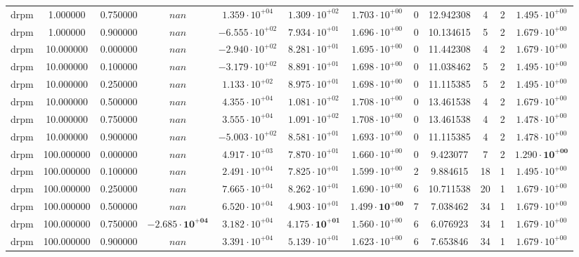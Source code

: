 \begin{table}
\begin{tabular}{cccccccccccc}
drpm & 1.000000 & 0.750000 & $nan$ & $1.359 \cdot 10^{+04}$ & $1.309 \cdot 10^{+02}$ & $1.703 \cdot 10^{+00}$ & 0 & 12.942308 & 4 & 2 & $1.495 \cdot 10^{+00}$ \\
drpm & 1.000000 & 0.900000 & $nan$ & $-6.555 \cdot 10^{+02}$ & $7.934 \cdot 10^{+01}$ & $1.696 \cdot 10^{+00}$ & 0 & 10.134615 & 5 & 2 & $1.679 \cdot 10^{+00}$ \\
drpm & 10.000000 & 0.000000 & $nan$ & $-2.940 \cdot 10^{+02}$ & $8.281 \cdot 10^{+01}$ & $1.695 \cdot 10^{+00}$ & 0 & 11.442308 & 4 & 2 & $1.679 \cdot 10^{+00}$ \\
drpm & 10.000000 & 0.100000 & $nan$ & $-3.179 \cdot 10^{+02}$ & $8.891 \cdot 10^{+01}$ & $1.698 \cdot 10^{+00}$ & 0 & 11.038462 & 5 & 2 & $1.495 \cdot 10^{+00}$ \\
drpm & 10.000000 & 0.250000 & $nan$ & $1.133 \cdot 10^{+02}$ & $8.975 \cdot 10^{+01}$ & $1.698 \cdot 10^{+00}$ & 0 & 11.115385 & 5 & 2 & $1.495 \cdot 10^{+00}$ \\
drpm & 10.000000 & 0.500000 & $nan$ & $4.355 \cdot 10^{+04}$ & $1.081 \cdot 10^{+02}$ & $1.708 \cdot 10^{+00}$ & 0 & 13.461538 & 4 & 2 & $1.679 \cdot 10^{+00}$ \\
drpm & 10.000000 & 0.750000 & $nan$ & $3.555 \cdot 10^{+04}$ & $1.091 \cdot 10^{+02}$ & $1.708 \cdot 10^{+00}$ & 0 & 13.461538 & 4 & 2 & $1.478 \cdot 10^{+00}$ \\
drpm & 10.000000 & 0.900000 & $nan$ & $-5.003 \cdot 10^{+02}$ & $8.581 \cdot 10^{+01}$ & $1.693 \cdot 10^{+00}$ & 0 & 11.115385 & 4 & 2 & $1.478 \cdot 10^{+00}$ \\
drpm & 100.000000 & 0.000000 & $nan$ & $4.917 \cdot 10^{+03}$ & $7.870 \cdot 10^{+01}$ & $1.660 \cdot 10^{+00}$ & 0 & 9.423077 & 7 & 2 & $\mathbf{1.290 \cdot 10^{+00}}$ \\
drpm & 100.000000 & 0.100000 & $nan$ & $2.491 \cdot 10^{+04}$ & $7.825 \cdot 10^{+01}$ & $1.599 \cdot 10^{+00}$ & 2 & 9.884615 & 18 & 1 & $1.495 \cdot 10^{+00}$ \\
drpm & 100.000000 & 0.250000 & $nan$ & $7.665 \cdot 10^{+04}$ & $8.262 \cdot 10^{+01}$ & $1.690 \cdot 10^{+00}$ & 6 & 10.711538 & 20 & 1 & $1.679 \cdot 10^{+00}$ \\
drpm & 100.000000 & 0.500000 & $nan$ & $6.520 \cdot 10^{+04}$ & $4.903 \cdot 10^{+01}$ & $\mathbf{1.499 \cdot 10^{+00}}$ & 7 & 7.038462 & 34 & 1 & $1.679 \cdot 10^{+00}$ \\
drpm & 100.000000 & 0.750000 & $\mathbf{-2.685 \cdot 10^{+04}}$ & $3.182 \cdot 10^{+04}$ & $\mathbf{4.175 \cdot 10^{+01}}$ & $1.560 \cdot 10^{+00}$ & 6 & 6.076923 & 34 & 1 & $1.679 \cdot 10^{+00}$ \\
drpm & 100.000000 & 0.900000 & $nan$ & $3.391 \cdot 10^{+04}$ & $5.139 \cdot 10^{+01}$ & $1.623 \cdot 10^{+00}$ & 6 & 7.653846 & 34 & 1 & $1.679 \cdot 10^{+00}$ \\
\bottomrule
\end{tabular}
\end{table}

